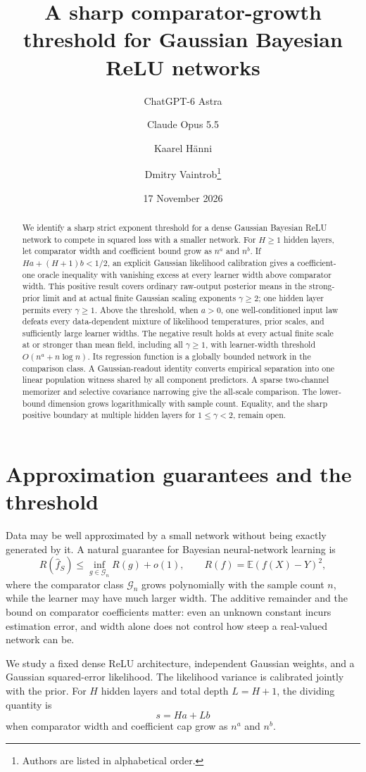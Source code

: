 \documentclass[11pt]{article}
\title{A sharp comparator-growth threshold for Gaussian Bayesian ReLU networks}
\author{ChatGPT-6 Astra \and Claude Opus 5.5 \and Kaarel H\"anni \and
Dmitry Vaintrob\thanks{Authors are listed in alphabetical order.}}
\date{17 November 2026}
\theoremstyle{remark}\newtheorem{remark}[theorem]{Remark}
\newcommand{\E}{\mathbb E}\newcommand{\R}{\mathbb R}\newcommand{\Pp}{\mathbb P}
\newcommand{\Risk}{R}\newcommand{\empRisk}{\widehat R}
\begin{document}
\maketitle
\begin{abstract}
We identify a sharp strict exponent threshold for a dense Gaussian Bayesian ReLU network to compete in squared loss with a smaller network. For $H\ge1$ hidden layers, let comparator width and coefficient bound grow as $n^a$ and $n^b$. If $Ha+(H+1)b<1/2$, an explicit Gaussian likelihood calibration gives a coefficient-one oracle inequality with vanishing excess at every learner width above comparator width. This positive result covers ordinary raw-output posterior means in the strong-prior limit and at actual finite Gaussian scaling exponents $\gamma\ge2$; one hidden layer permits every $\gamma\ge1$. Above the threshold, when $a>0$, one well-conditioned input law defeats every data-dependent mixture of likelihood temperatures, prior scales, and sufficiently large learner widths. The negative result holds at every actual finite scale at or stronger than mean field, including all $\gamma\ge1$, with learner-width threshold $O(n^a+n\log n)$. Its regression function is a globally bounded network in the comparison class. A Gaussian-readout identity converts empirical separation into one linear population witness shared by all component predictors. A sparse two-channel memorizer and selective covariance narrowing give the all-scale comparison. The lower-bound dimension grows logarithmically with sample count. Equality, and the sharp positive boundary at multiple hidden layers for $1\le\gamma<2$, remain open.
\end{abstract}

\section{Approximation guarantees and the threshold}
Data may be well approximated by a small network without being exactly generated by it. A natural guarantee for Bayesian neural-network learning is
\[
 \Risk(\widehat f_S)\le\inf_{g\in\mathcal G_n}\Risk(g)+o(1),
 \qquad \Risk(f)=\E(f(X)-Y)^2,
\]
where the comparator class $\mathcal G_n$ grows polynomially with the sample count $n$, while the learner may have much larger width. The additive remainder and the bound on comparator coefficients matter: even an unknown constant incurs estimation error, and width alone does not control how steep a real-valued network can be.

We study a fixed dense ReLU architecture, independent Gaussian weights, and a Gaussian squared-error likelihood. The likelihood variance is calibrated jointly with the prior. For $H$ hidden layers and total depth $L=H+1$, the dividing quantity is
\[
 s=Ha+Lb
\]
when comparator width and coefficient cap grow as $n^a$ and $n^b$.
\end{document}
